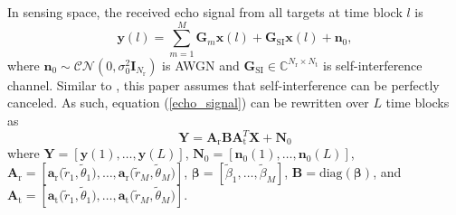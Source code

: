 \documentclass[10pt,journal,twocolumn]{IEEEtran}
\begin{document}
In sensing space, the received echo signal from all targets at time block $l$ is 
\begin{equation}
\mathbf{y}\left(l\right) =\sum_{m=1}^{M}\mathbf{G}_m\mathbf{x}\left(l\right)+\mathbf{G}_{\text{SI}}\mathbf{x}\left(l\right)+\mathbf{n}_0,
\label{echo_signal}
\end{equation}
where $\mathbf{n}_0\sim \mathcal{CN}\left(0,\sigma^2_0\mathbf{I}_{N_{\text{r}}}\right)$ is AWGN and $\mathbf{G}_{\text{SI}}\in\mathbb{C}^{N_{\text{r}}\times N_{\text{t}}}$ is self-interference channel. Similar to \cite{10579914,10135096}, this paper assumes that self-interference can be perfectly canceled. As such, equation (\ref{echo_signal}) can be rewritten over $L$ time blocks as
\begin{equation}
\mathbf{Y}=\mathbf{A}_\text{r}\mathbf{B}\mathbf{A}^T_\text{t}\mathbf{X}+\mathbf{N}_0
\label{Sensing_matrix}
\end{equation}
where $\mathbf{Y}=\left[\mathbf{y}(1),\dots,\mathbf{y}(L)\right]$, $\mathbf{N}_0=\left[\mathbf{n}_0(1),\dots,\mathbf{n}_0(L)\right]$, $\mathbf{A}_\text{r}=\left[\mathbf{a}_\text{r}\big(\tilde r_1,\tilde\theta_1\big),\dots,\mathbf{a}_\text{r}\big(\tilde r_M,\tilde\theta_M\big)\right]$,  $\boldsymbol{\beta}=\left[\tilde\beta_1,\dots,\tilde\beta_M\right]$, $\mathbf{B}=\text{diag}\left(\boldsymbol{\beta}\right)$, and $\mathbf{A}_\text{t}=\left[\mathbf{a}_\text{t}\big(\tilde r_1,\tilde\theta_1\big),\dots,\mathbf{a}_\text{t}\big(\tilde r_M,\tilde\theta_M\big)\right]$.
\end{document}
